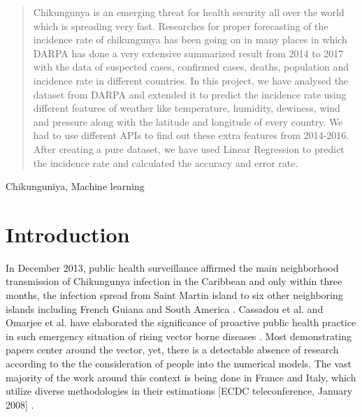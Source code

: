 \documentclass[conference]{IEEEtran}
\begin{document}




\maketitle

\thispagestyle{fancy}

\begin{abstract}
Chikungunya   is an emerging threat for health security all over the world  which is spreading very fast. Researches for proper forecasting of the incidence rate of chikungunya has been going on in many places in which DARPA has done a very extensive summarized result from 2014 to 2017 with the data of suspected cases, confirmed cases, deaths, population and incidence rate in different countries. In this project, we have analysed the dataset from DARPA and extended it to predict the incidence rate using different features of weather like temperature, humidity, dewiness, wind and pressure  along with the latitude and longitude of every country. We had to use different APIs to find out these extra features from 2014-2016. After creating a pure dataset, we have used Linear Regression to predict the incidence rate and calculated the accuracy and error rate.
\end{abstract}


\begin{keywords}
Chikunguniya, Machine learning
\end{keywords}


%
\IEEEpeerreviewmaketitle



\section{Introduction}
In December 2013, public health surveillance affirmed the main neighborhood transmission of Chikungunya infection in the Caribbean and only within three months, the infection spread from  Saint Martin island to six other neighboring islands including French Guiana and South America \cite{one}. Cassadou et al. and Omarjee et al. have elaborated the significance of proactive public health practice in such emergency situation of rising vector borne diseases \cite{two}. Most demonstrating papers center around the vector, yet, there is a detectable absence of research according to the the consideration of people into the numerical models. The vast majority of the work around this context is being done in France and Italy, which utilize diverse methodologies in their estimations [ECDC teleconference, January 2008] \cite{three}.
\end{document}

